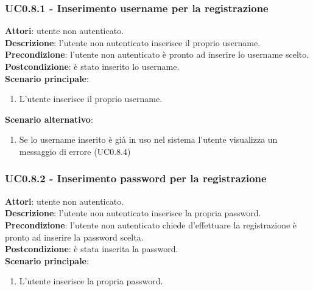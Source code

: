 	\subsubsection{UC0.8.1 - Inserimento username per la registrazione}{
		\label{uc0.8.1}
		\textbf{Attori}: utente non autenticato. \\
		\textbf{Descrizione}: l'utente non autenticato inserisce il proprio username.	\\
		\textbf{Precondizione}: l'utente non autenticato è pronto ad inserire lo username scelto.	\\
		\textbf{Postcondizione}: è stato inserito lo username.\\
		\textbf{Scenario principale}:
		\begin{enumerate}
			\item L'utente inserisce il proprio username.
		\end{enumerate}
		\textbf{Scenario alternativo}:
		\begin{enumerate}
			\item Se lo username  inserito è già in uso nel sistema l'utente visualizza un messaggio di errore (UC0.8.4)
		\end{enumerate}
		}
	\subsubsection{UC0.8.2 - Inserimento password per la registrazione} {
		\label{uc0.8.2}
		\textbf{Attori}: utente non autenticato. \\
		\textbf{Descrizione}: l'utente non autenticato inserisce la propria password.	\\
		\textbf{Precondizione}: l'utente non autenticato chiede d'effettuare la registrazione è pronto ad inserire la password scelta.	\\
		\textbf{Postcondizione}: è stata inserita la password.\\
		\textbf{Scenario principale}:
		\begin{enumerate}
			\item L'utente inserisce la propria password.
		\end{enumerate}
		}
